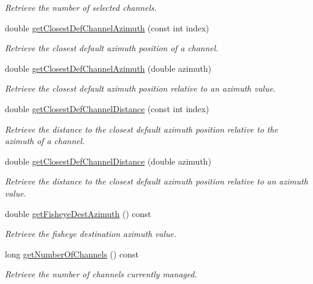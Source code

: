 \begin{DoxyCompactItemize}
\begin{DoxyCompactList}\small\item\em Retrieve the number of selected channels. \end{DoxyCompactList}\item 
double \hyperlink{class_hoa2_d_1_1_channel_manager_a8d86568ba79cb7419fd9fd1ab3c384b4}{get\-Closest\-Def\-Channel\-Azimuth} (const int index)
\begin{DoxyCompactList}\small\item\em Retrieve the closest default azimuth position of a channel. \end{DoxyCompactList}\item 
double \hyperlink{class_hoa2_d_1_1_channel_manager_a658e587f189ace4c078fbb0543356164}{get\-Closest\-Def\-Channel\-Azimuth} (double azimuth)
\begin{DoxyCompactList}\small\item\em Retrieve the closest default azimuth position relative to an azimuth value. \end{DoxyCompactList}\item 
double \hyperlink{class_hoa2_d_1_1_channel_manager_ab446c15bed633155b71524e334d36453}{get\-Closest\-Def\-Channel\-Distance} (const int index)
\begin{DoxyCompactList}\small\item\em Retrieve the distance to the closest default azimuth position relative to the azimuth of a channel. \end{DoxyCompactList}\item 
double \hyperlink{class_hoa2_d_1_1_channel_manager_aa24f7c2eeb991c5070d87e2e844a75c2}{get\-Closest\-Def\-Channel\-Distance} (double azimuth)
\begin{DoxyCompactList}\small\item\em Retrieve the distance to the closest default azimuth position relative to an azimuth value. \end{DoxyCompactList}\item 
double \hyperlink{class_hoa2_d_1_1_channel_manager_a1b18dfa77d811da0d3a3d743d093554b}{get\-Fisheye\-Dest\-Azimuth} () const 
\begin{DoxyCompactList}\small\item\em Retrieve the fisheye destination azimuth value. \end{DoxyCompactList}\item 
long \hyperlink{class_hoa2_d_1_1_channel_manager_a94ae989e2460f1e09fd817e2f44425d4}{get\-Number\-Of\-Channels} () const 
\begin{DoxyCompactList}\small\item\em Retrieve the number of channels currently managed. \end{DoxyCompactList}\item 

\end{DoxyCompactItemize}
